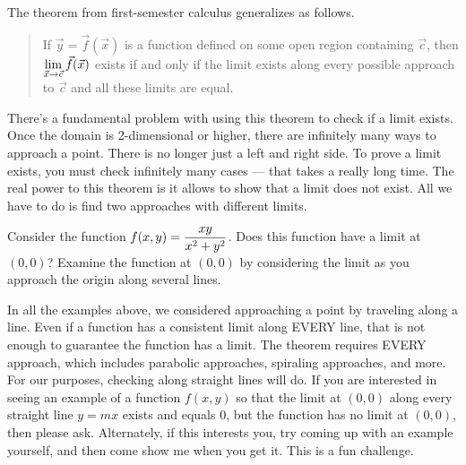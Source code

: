 The theorem from first-semester calculus generalizes as follows.
\begin{quote}
 If $\vec y=\vec f(\vec x)$ is a function defined on some open region containing $\vec c$, then $\displaystyle\lim_{\vec x\to \vec c}\vec f(\vec x)$ exists if and only if the limit exists along every possible approach to $\vec c$ and all these limits are equal.
\end{quote}
There's a fundamental problem with using this theorem to check if a limit exists. Once the domain is 2-dimensional or higher, there are infinitely many ways to approach a point. There is no longer just a left and right side. To prove a limit exists, you must check infinitely many cases --- that takes a really long time.  The real power to this theorem is it allows to show that a limit does not exist.  All we have to do is find two approaches with different limits.



\begin{problem}
%
%
 Consider the function $\displaystyle f(x,y) = \frac{xy}{x^2+y^2}$.  Does this function have a limit at $(0,0)$?  Examine the function at $(0,0)$ by considering the limit as you approach the origin along several lines. 
\end{problem}

In all the examples above, we considered approaching a point by traveling along a line. Even if a function has a consistent limit along EVERY line, that is not enough to guarantee the function has a limit. The theorem requires EVERY approach, which includes parabolic approaches, spiraling approaches, and more. For our purposes, checking along straight lines will do.  If you are interested in seeing an example of a function $f(x,y)$ so that the limit at $(0,0)$ along every straight line $y=mx$ exists and equals 0, but the function has no limit at $(0,0)$, then please ask.  Alternately, if this interests you, try coming up with an example yourself, and then come show me when you get it. This is a fun challenge.

